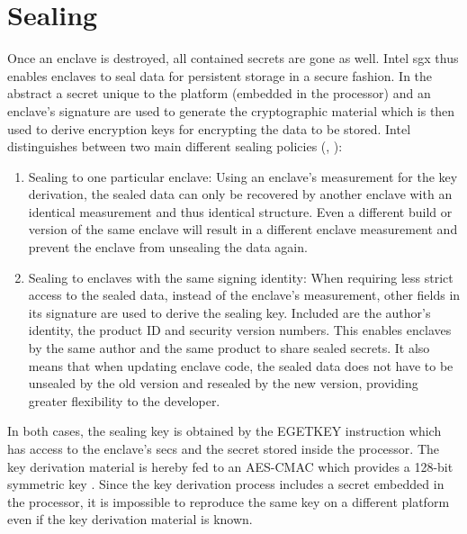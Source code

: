 \section{Sealing}
Once an enclave is destroyed, all contained secrets are gone as well. Intel \ac{sgx} thus enables enclaves to seal data for persistent storage in a secure fashion. In the abstract a
secret unique to the platform (embedded in the processor) and an enclave's signature are used to generate the cryptographic material which is then used to derive encryption keys
for encrypting the data to be stored. Intel distinguishes between two main different sealing policies (\cite{EnclaveWritersGuide}, \cite{IntelSealing}):
\begin{enumerate}
    \item Sealing to one particular enclave: Using an enclave's measurement for the key derivation, the sealed data can only be recovered by another enclave with an identical
          measurement and thus identical structure. Even a different build or version of the same enclave will result in a different enclave measurement and prevent the enclave
          from unsealing the data again.
    \item Sealing to enclaves with the same signing identity: When requiring less strict access to the sealed data, instead of the enclave's measurement, other fields in its
          signature are used to derive the sealing key. Included are the author's identity, the product ID and security version numbers. This enables enclaves by the same
          author and the same product to share sealed secrets. It also means that when updating enclave code, the sealed data does not have to be unsealed by the old version
          and resealed by the new version, providing greater flexibility to the developer.
\end{enumerate}
In both cases, the sealing key is obtained by the EGETKEY instruction which has access to the enclave's \ac{secs} and the secret stored inside the processor. The key derivation material
is hereby fed to an AES-CMAC which provides a 128-bit symmetric key \cite{Costan2016IntelSE}. Since the key derivation process includes a secret embedded in the processor, it is
impossible to reproduce the same key on a different platform even if the key derivation material is known.
